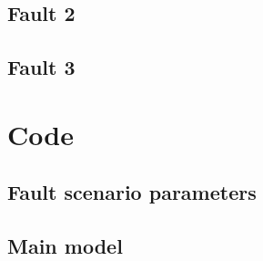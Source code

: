 





\section{Fault 2}
\label{app:fault2}







\section{Fault 3}
\label{app:fault3}





\chapter{Code}
\label{app:code}

\section{Fault scenario parameters}
\label{app:fault-scenarios}

% 


% 

\section{Main model}



